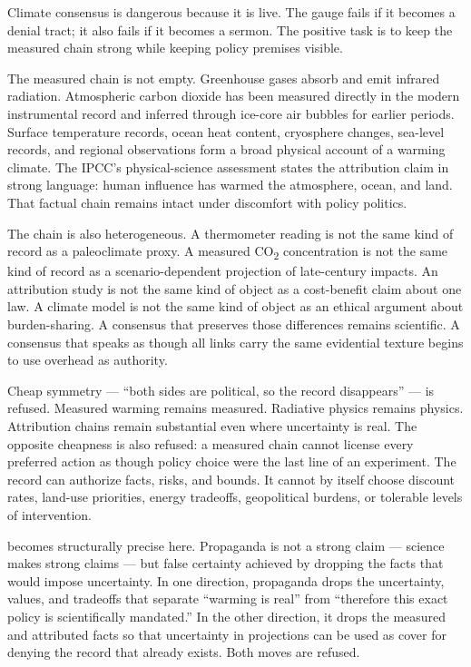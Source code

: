 Climate consensus is dangerous because it is live.
The gauge fails if it becomes a denial tract; it also fails if it
becomes a sermon. The positive task is to keep the measured chain
strong while keeping policy premises visible.

The measured chain is not empty. Greenhouse gases absorb and emit
infrared radiation. Atmospheric carbon dioxide has been measured
directly in the modern instrumental record and inferred through
ice-core air bubbles for earlier periods. Surface temperature records,
ocean heat content, cryosphere changes, sea-level records, and regional
observations form a broad physical account of a warming climate. The
IPCC's physical-science assessment states the attribution claim in
strong language: human influence has warmed the atmosphere, ocean, and
land. That factual chain remains intact under discomfort with policy
politics.

The chain is also heterogeneous. A thermometer reading is not the same
kind of record as a paleoclimate proxy. A measured CO\textsubscript{2}
concentration is not the same kind of record as a scenario-dependent
projection of late-century impacts. An attribution study is not the
same kind of object as a cost-benefit claim about one law. A climate
model is not the same kind of object as an ethical argument about
burden-sharing. A consensus that preserves those differences remains
scientific. A consensus that speaks as though all links carry the same
evidential texture begins to use overhead as authority.

Cheap symmetry --- ``both sides are political, so the record
disappears'' --- is refused. Measured warming remains measured.
Radiative physics remains physics. Attribution chains remain
substantial even where uncertainty is real. The opposite cheapness is
also refused: a measured chain cannot license every preferred action
as though policy choice were the last line of an experiment. The
record can authorize facts, risks, and bounds. It cannot by itself
choose discount rates, land-use priorities, energy tradeoffs,
geopolitical burdens, or tolerable levels of intervention.

 becomes structurally precise here. Propaganda is not
a strong claim --- science makes strong claims --- but false certainty
achieved by dropping the facts that would impose uncertainty. In one
direction, propaganda drops the uncertainty, values, and tradeoffs that
separate ``warming is real'' from ``therefore this exact policy is
scientifically mandated.'' In the other direction, it drops the
measured and attributed facts so that uncertainty in projections can be
used as cover for denying the record that already exists. Both moves
are refused.

